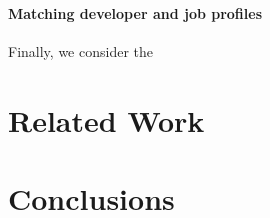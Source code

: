 \documentclass[conference]{IEEEtran}
\begin{document}
\paragraph{Matching developer and job profiles}
Finally, we consider the 


\section{Related Work}

\section{Conclusions}



\end{document}
